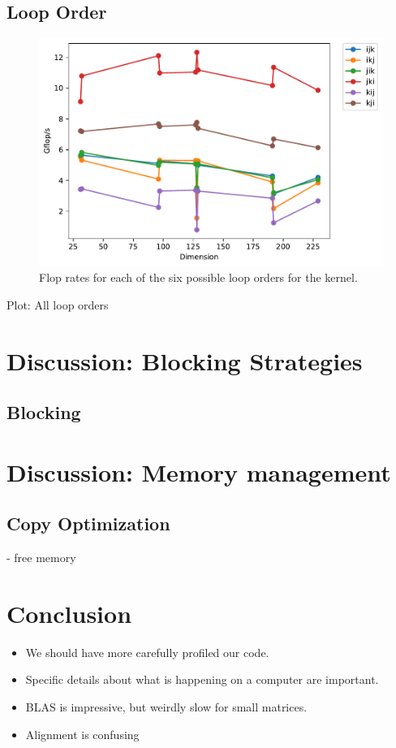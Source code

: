 \documentclass{article}
\begin{document}
\subsection{Loop Order}
\begin{figure}
    \centering
    \includegraphics[width=0.8\columnwidth]{LoopOrder.pdf}
    \caption{Flop rates for each of the six possible loop orders for the kernel.}
    \label{fig:LoopOrder}
\end{figure}

Plot: All loop orders


\section{Discussion: Blocking Strategies}

\subsection{Blocking}


\section{Discussion: Memory management}

\subsection{Copy Optimization}
 - free memory







\section{Conclusion}
\begin{itemize}
	\item We should have more carefully profiled our code. 
	\item Specific details about what is happening on a computer are important.
	\item BLAS is impressive, but weirdly slow for small matrices.
	\item Alignment is confusing
\end{itemize}
\end{document}
